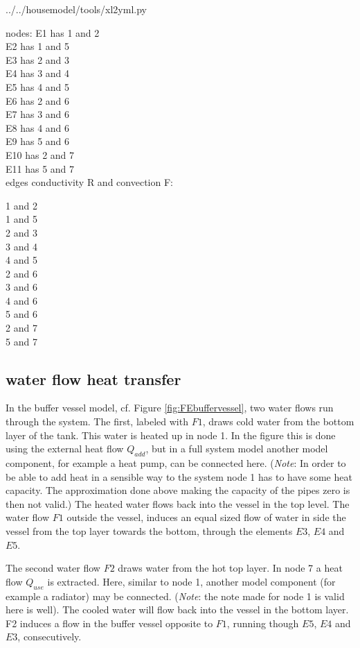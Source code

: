  
{../../housemodel/tools/xl2yml.py}
	
nodes:
E1 has 1 and 2\\
E2 has 1 and 5\\
E3 has 2 and 3\\
E4 has 3 and 4\\
E5 has 4 and 5\\
E6 has 2 and 6\\
E7 has 3 and 6\\
E8 has 4 and 6\\
E9 has 5 and 6\\
E10 has 2 and 7\\
E11 has 5 and 7\\

edges conductivity R and convection F:

1 and 2\\
1 and 5\\
2 and 3\\
3 and 4\\
4 and 5\\
2 and 6\\
3 and 6\\
4 and 6\\
5 and 6\\
2 and 7\\
5 and 7\\


\subsection{water flow heat transfer}
In the buffer vessel model, cf. Figure \ref{fig:FEbuffervessel}, two water flows run through the system. The first, labeled with $F1$, draws cold water from the bottom layer of the tank. This water is heated up in node 1. In the figure this is done using the external heat flow $Q_{add}$, but in a full system model another model component, for example a heat pump, can be connected here. (\emph{Note}: In order to be able to add heat in a sensible way to the system node 1 has to have some heat capacity. The approximation done above making the capacity of the pipes zero is then not valid.) 
The heated water flows back into the vessel in the top level. The water flow $F1$ outside the vessel, induces an equal sized flow of water in side the vessel from the top layer towards the bottom, through the elements $E3$, $E4$ and $E5$. 

The second water flow $F2$ draws water from the hot top layer. In node 7 a heat flow $Q_{use}$ is extracted. Here, similar to node 1, another model component (for example a radiator) may be connected. (\emph{Note}: the note made for node 1 is valid here is well). 
The cooled water will flow back into the vessel in the bottom layer. F2 induces a flow in the buffer vessel opposite to $F1$, running though $E5$, $E4$ and $E3$,  consecutively. 

